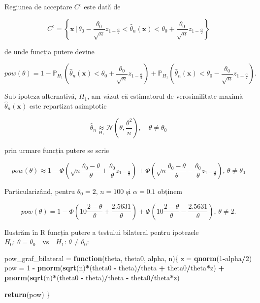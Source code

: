 \documentclass[]{article}
\newenvironment{Shaded}{\begin{snugshade}}{\end{snugshade}}
\newcommand{\KeywordTok}[1]{\textcolor[rgb]{0.13,0.29,0.53}{\textbf{#1}}}
\newcommand{\DecValTok}[1]{\textcolor[rgb]{0.00,0.00,0.81}{#1}}
\newcommand{\StringTok}[1]{\textcolor[rgb]{0.31,0.60,0.02}{#1}}
\newcommand{\ControlFlowTok}[1]{\textcolor[rgb]{0.13,0.29,0.53}{\textbf{#1}}}
\newcommand{\OperatorTok}[1]{\textcolor[rgb]{0.81,0.36,0.00}{\textbf{#1}}}
\newcommand{\NormalTok}[1]{#1}
\begin{document}
Regiunea de acceptare \(C^c\) este dată de

\[
  C^c = \left\{\mathbf{x}\,|\, \theta_0 - \frac{\theta_0}{\sqrt{n}}z_{1-\frac{\alpha}{2}}<\hat{\theta}_n(\mathbf{x}) < \theta_0 + \frac{\theta_0}{\sqrt{n}}z_{1-\frac{\alpha}{2}}\right\}
\]

de unde funcția putere devine

\[
  pow(\theta) = 1 - \mathbb{P}_{H_1}\left(\hat{\theta}_n(\mathbf{x}) < \theta_0 + \frac{\theta_0}{\sqrt{n}}z_{1-\frac{\alpha}{2}}\right) + \mathbb{P}_{H_1}\left(\hat{\theta}_n(\mathbf{x}) < \theta_0 - \frac{\theta_0}{\sqrt{n}}z_{1-\frac{\alpha}{2}}\right).
\]

Sub ipoteza alternativă, \(H_1\), am văzut că estimatorul de
verosimilitate maximă \(\hat{\theta}_n(\mathbf{x})\) este repartizat
asimptotic

\[
  \hat{\theta}_n \underset{H_1}{\approx} \mathcal{N}\left(\theta, \frac{\theta^2}{n}\right),\quad \theta \neq \theta_0
\]

prin urmare funcția putere se scrie

\[
  pow(\theta) \approx 1 - \Phi\left(\sqrt{n}\frac{\theta_0 - \theta}{\theta} + \frac{\theta_0}{\theta}z_{1-\frac{\alpha}{2}}\right) + \Phi\left(\sqrt{n}\frac{\theta_0 - \theta}{\theta} - \frac{\theta_0}{\theta}z_{1-\frac{\alpha}{2}}\right),\,\theta\neq \theta_0
\]

Particularizând, pentru \(\theta_0 = 2\), \(n = 100\) și
\(\alpha = 0.1\) obținem

\[
  pow(\theta) = 1 - \Phi\left(10\frac{2 - \theta}{\theta} + \frac{2.5631}{\theta}\right) + \Phi\left(10\frac{2 - \theta}{\theta} - \frac{2.5631}{\theta}\right),\, \theta\neq 2.
\]

Ilustrăm în R funcția putere a testului bilateral pentru ipotezele
\(H_0:\, \theta = \theta_0 \quad \text{vs}\quad H_1:\, \theta \neq \theta_0\):

\begin{Shaded}
\begin{Highlighting}[]
\NormalTok{pow_graf_bilateral =}\StringTok{ }\ControlFlowTok{function}\NormalTok{(theta, theta0, alpha, n)\{}
\NormalTok{  z =}\StringTok{ }\KeywordTok{qnorm}\NormalTok{(}\DecValTok{1}\OperatorTok{-}\NormalTok{alpha}\OperatorTok{/}\DecValTok{2}\NormalTok{)}
\NormalTok{  pow =}\StringTok{ }\DecValTok{1} \OperatorTok{-}\StringTok{ }\KeywordTok{pnorm}\NormalTok{(}\KeywordTok{sqrt}\NormalTok{(n)}\OperatorTok{*}\NormalTok{(theta0 }\OperatorTok{-}\StringTok{ }\NormalTok{theta)}\OperatorTok{/}\NormalTok{theta }\OperatorTok{+}\StringTok{ }\NormalTok{theta0}\OperatorTok{/}\NormalTok{theta}\OperatorTok{*}\NormalTok{z) }\OperatorTok{+}
\StringTok{    }\KeywordTok{pnorm}\NormalTok{(}\KeywordTok{sqrt}\NormalTok{(n)}\OperatorTok{*}\NormalTok{(theta0 }\OperatorTok{-}\StringTok{ }\NormalTok{theta)}\OperatorTok{/}\NormalTok{theta }\OperatorTok{-}\StringTok{ }\NormalTok{theta0}\OperatorTok{/}\NormalTok{theta}\OperatorTok{*}\NormalTok{z)}
  
  \KeywordTok{return}\NormalTok{(pow)}
\NormalTok{\}}
\end{Highlighting}
\end{Shaded}
\end{document}
